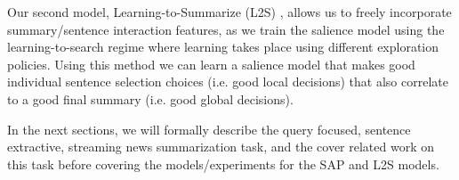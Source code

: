 Our second model, Learning-to-Summarize (L2S) \cite{kedzie2016real}, allows 
us to freely incorporate summary/sentence interaction
features, as we train the salience model using the learning-to-search regime
\cite{daume2009search,chang2015learning}
where learning takes place using different exploration policies. Using 
this method we can learn a salience model that makes good individual sentence
selection choices (i.e. good local decisions) that also correlate to a good 
final summary (i.e. good global decisions). 

In the next sections, we will formally describe the query focused, 
sentence extractive, streaming news summarization task, and the cover
related work on this task before covering the models/experiments for the 
SAP and L2S models. 
 


